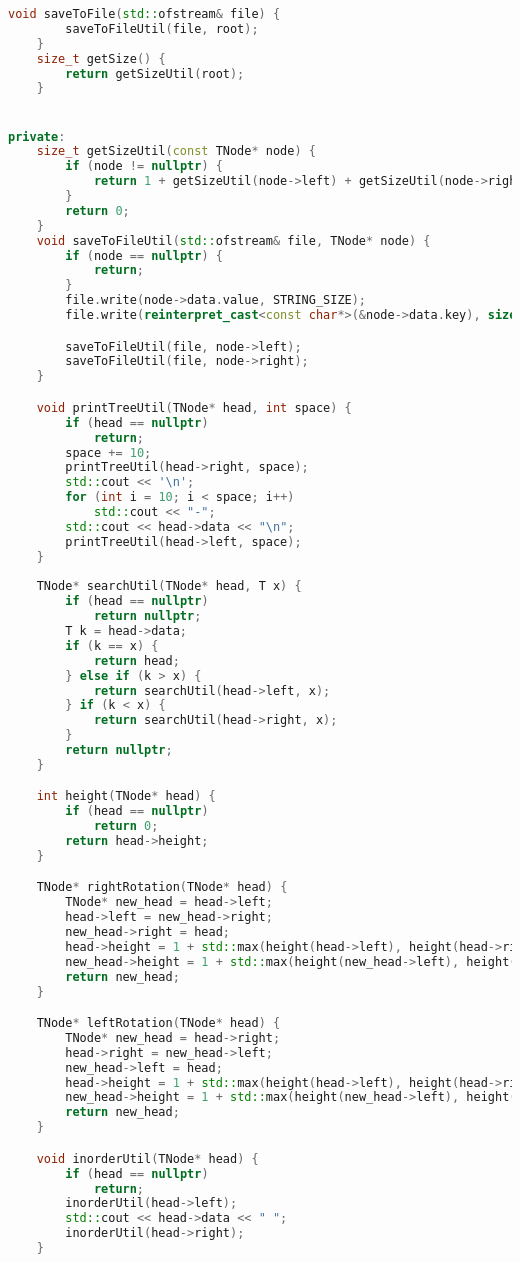 \documentclass[12pt]{article}
\begin{document}
\begin{lstlisting}[language=C++]
    void saveToFile(std::ofstream& file) {
        saveToFileUtil(file, root);
    }
    size_t getSize() {
        return getSizeUtil(root);
    }


private:
    size_t getSizeUtil(const TNode* node) {
        if (node != nullptr) {
            return 1 + getSizeUtil(node->left) + getSizeUtil(node->right);
        }
        return 0;
    }
    void saveToFileUtil(std::ofstream& file, TNode* node) {
        if (node == nullptr) {
            return;
        }
        file.write(node->data.value, STRING_SIZE);
        file.write(reinterpret_cast<const char*>(&node->data.key), sizeof(node->data.key));

        saveToFileUtil(file, node->left);
        saveToFileUtil(file, node->right);
    }

    void printTreeUtil(TNode* head, int space) {
        if (head == nullptr)
            return;
        space += 10;
        printTreeUtil(head->right, space);
        std::cout << '\n';
        for (int i = 10; i < space; i++)
            std::cout << "-";
        std::cout << head->data << "\n";
        printTreeUtil(head->left, space);
    }
    
    TNode* searchUtil(TNode* head, T x) {
        if (head == nullptr)
            return nullptr;
        T k = head->data;
        if (k == x) {
            return head;
        } else if (k > x) {
            return searchUtil(head->left, x);
        } if (k < x) {
            return searchUtil(head->right, x);
        }
        return nullptr;
    }

    int height(TNode* head) {
        if (head == nullptr)
            return 0;
        return head->height;
    }

    TNode* rightRotation(TNode* head) {
        TNode* new_head = head->left;
        head->left = new_head->right;
        new_head->right = head;
        head->height = 1 + std::max(height(head->left), height(head->right));
        new_head->height = 1 + std::max(height(new_head->left), height(new_head->right));
        return new_head;
    }

    TNode* leftRotation(TNode* head) {
        TNode* new_head = head->right;
        head->right = new_head->left;
        new_head->left = head;
        head->height = 1 + std::max(height(head->left), height(head->right));
        new_head->height = 1 + std::max(height(new_head->left), height(new_head->right));
        return new_head;
    }

    void inorderUtil(TNode* head) {
        if (head == nullptr)
            return;
        inorderUtil(head->left);
        std::cout << head->data << " ";
        inorderUtil(head->right);
    }



\end{lstlisting}
\end{document}
